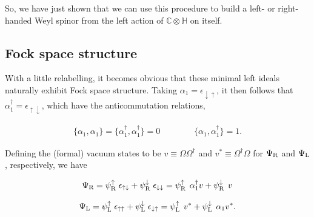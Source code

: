 \documentclass[letterpaper,12pt,titlepage,oneside,final]{book}
\newcommand{\CH}{\mathbb{C}\otimes\mathbb{H}}
\begin{document}
So, we have just shown that we can use this procedure to build a left- or right-handed Weyl spinor from the left action of $\CH$ on itself.

\subsection{Fock space structure\label{fock}  }

With a little relabelling, it becomes obvious that these minimal left ideals naturally exhibit Fock space structure.  Taking $\alpha_1 = \epsilon_{\downarrow\uparrow}$, it then follows that $\alpha_1^{\dagger} = \epsilon_{\uparrow\downarrow}$, which have the anticommutation relations,

\begin{equation}\begin{array}{lll} \{\alpha_1, \alpha_1\} =  \{\alpha_1^{\dagger}, \alpha_1^{\dagger}\} = 0 & \hspace{1cm} &  \{\alpha_1, \alpha_1^{\dagger}\} = 1.
\end{array}\end{equation}

\noindent Defining the (formal) vacuum states to be $v\equiv \Omega\Omega^{\dagger}$ and $v^{*}\equiv \Omega^{\dagger}\Omega$ for $\Psi_{\textup{R}}$ and $\Psi_{\textup{L}}$, respectively, we have

\begin{equation}  \Psi_{\textup{R}}  =  \psi^{\uparrow}_{\textup{R}} \hspace{1mm} \epsilon_{\uparrow \downarrow} +  \psi^{\downarrow}_{\textup{R}} \hspace{1mm} \epsilon_{\downarrow \downarrow} =   \psi^{\uparrow}_{\textup{R}} \hspace{1.5mm} \alpha_1^{\dagger}v +  \psi^{\downarrow}_{\textup{R}} \hspace{1.5mm} v
\end{equation}

\begin{equation}   \Psi_{\textup{L}} = \psi^{\uparrow}_{\textup{L}} \hspace{1mm} \epsilon_{\uparrow \uparrow} +  \psi^{\downarrow}_{\textup{L}} \hspace{1mm} \epsilon_{\downarrow \uparrow} = \psi^{\uparrow}_{\textup{L}} \hspace{1.5mm} v^* +  \psi^{\downarrow}_{\textup{L}} \hspace{1.5mm} \alpha_1v^*.
\end{equation}
\end{document}
